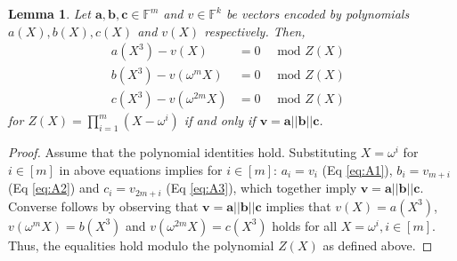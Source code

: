 \documentclass[sigconf]{acmart}
\newtheorem{lemma}{Lemma}[section]
\renewcommand{\vec}{\mathbf} %
\newcommand{\F}{\mathbb{F}}
\begin{document}
		\begin{lemma}\label{lem:vec-concatenation}
			Let $\vec{a},\vec{b},\vec{c}\in \F^m$  and $v\in \F^k$ be vectors encoded by polynomials
			$a(X),b(X),c(X)$ and $v(X)$ respectively. Then,
			\begin{align}
				a(X^3) - v(X)  &= 0  \quad \text{ mod $Z(X)$ } \tag{A1}\label{eq:A1}\\
				b(X^3) - v(\omega^m X)  &= 0   \quad \text{ mod $Z(X)$ } \tag{A2}\label{eq:A2}\\
				c(X^3) - v(\omega^{2m} X) &= 0 \quad \text{ mod $Z(X)$ } \tag{A3}\label{eq:A3}
			\end{align}
			for $Z(X)=\prod_{i=1}^m (X-\omega^i)$ if and only if $\vec{v}=\vec{a}||\vec{b}||\vec{c}$.
		\end{lemma}
		\begin{proof}
			Assume that the polynomial identities hold. Substituting $X=\omega^i$ for $i\in [m]$ in above equations implies
			for $i\in [m]$: $a_i=v_i$ (Eq \eqref{eq:A1}), $b_i=v_{m+i}$ (Eq \eqref{eq:A2}) and $c_i=v_{2m+i}$ (Eq \eqref{eq:A3}),
			which together imply $\vec{v}=\vec{a}||\vec{b}||\vec{c}$. Converse follows by observing that $\vec{v}=\vec{a}||\vec{b}||\vec{c}$
			implies that $v(X) = a(X^3)$, $v(\omega^m X)=b(X^3)$ and $v(\omega^{2m} X)=c(X^3)$ holds for all $X=\omega^i, i\in [m]$.
			Thus, the equalities hold modulo the polynomial $Z(X)$ as defined above.
		\end{proof}
		
\end{document}
